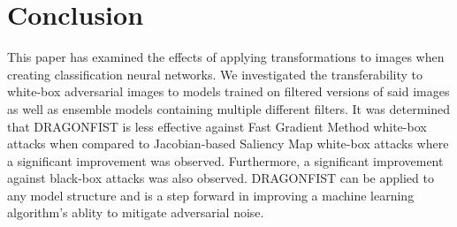 \section{Conclusion} \label{s:conclusion}
	This paper has examined the effects of applying transformations to images when creating classification neural networks. We investigated the transferability to white-box adversarial images to models trained on filtered versions of said images as well as ensemble models containing multiple different filters. It was determined that DRAGONFIST is less effective against Fast Gradient Method white-box attacks when compared to Jacobian-based Saliency Map white-box attacks where a significant improvement was observed. Furthermore, a significant improvement against black-box attacks was also observed. DRAGONFIST can be applied to any model structure and is a step forward in improving a machine learning algorithm's ablity to mitigate adversarial noise.
